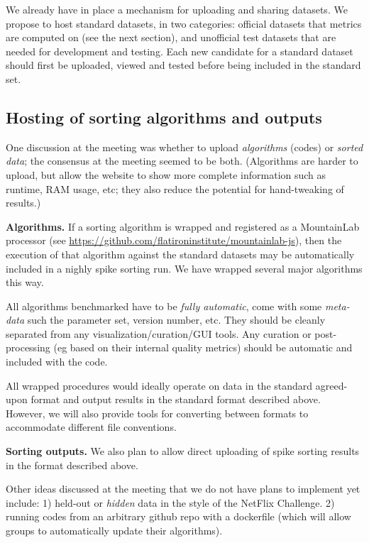 \documentclass[10pt]{article}
\begin{document}
We already have in place a mechanism for uploading and sharing datasets.
We propose to host standard datasets, in two categories:
official datasets that metrics are computed on
(see the next section),
and unofficial test datasets that are needed for development and testing.
Each new candidate for a standard dataset should first be uploaded, viewed and tested before being included in the standard set.

\subsection{Hosting of sorting algorithms and outputs}

One discussion at the meeting was 
whether to upload {\em algorithms} (codes) or {\em sorted data};
the consensus at the meeting seemed to be both.
(Algorithms are harder to upload, but allow the website to show more complete
information such as runtime, RAM usage, etc; they also reduce the potential
for hand-tweaking of results.)

{\bf Algorithms.}
If a sorting algorithm is wrapped and registered as a MountainLab processor (see \url{https://github.com/flatironinstitute/mountainlab-js}), then the execution of that algorithm against the standard datasets may be automatically included in a nighly spike sorting run.
We have wrapped several major algorithms this way.

All algorithms benchmarked have to be {\em fully automatic},
come with some {\em meta-data} such the parameter set, version number, etc.
They
should be cleanly separated from any visualization/curation/GUI tools.
Any curation or post-processing (eg based on their internal quality metrics)
should be automatic and included with the code.

All wrapped procedures would ideally operate on data in the standard agreed-upon format and output results in the standard format described above. However, we will also provide tools for converting between formats to accommodate different file conventions.

{\bf Sorting outputs.}
We also plan to allow
direct uploading of spike sorting results in the format described above.

Other ideas discussed at the meeting that we do not have plans to
implement yet include:
1) held-out or {\em hidden} data in the style of the NetFlix Challenge.
2) running codes from an arbitrary github repo with a dockerfile (which
will allow groups to automatically update their algorithms).
\end{document}
